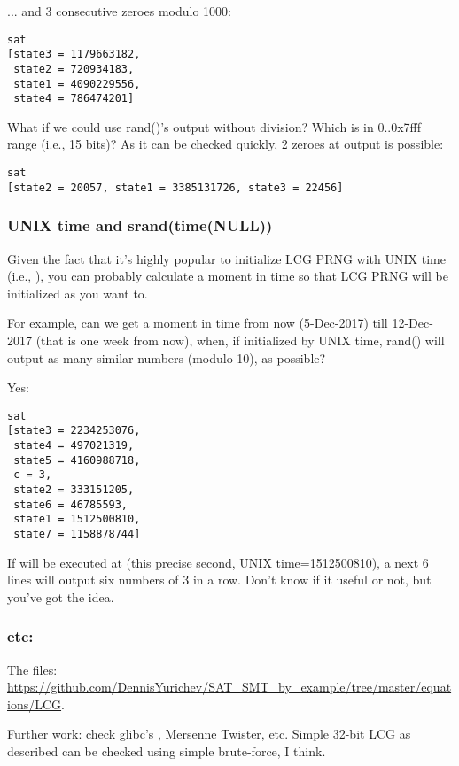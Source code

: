 ... and 3 consecutive zeroes modulo 1000:



\begin{lstlisting}
sat
[state3 = 1179663182,
 state2 = 720934183,
 state1 = 4090229556,
 state4 = 786474201]
\end{lstlisting}

What if we could use rand()'s output without division? Which is in 0..0x7fff range (i.e., 15 bits)?
As it can be checked quickly, 2 zeroes at output is possible:



\begin{lstlisting}
sat
[state2 = 20057, state1 = 3385131726, state3 = 22456]
\end{lstlisting}

\subsubsection{UNIX time and srand(time(NULL))}

Given the fact that it's highly popular to initialize LCG PRNG with UNIX time (i.e., ), you can probably calculate a moment in time so that LCG PRNG will be initialized as you want to.

For example, can we get a moment in time from now (5-Dec-2017) till 12-Dec-2017 (that is one week from now), when, if initialized by UNIX time, rand() will output as many similar numbers (modulo 10), as possible?



Yes:

\begin{lstlisting}
sat
[state3 = 2234253076,
 state4 = 497021319,
 state5 = 4160988718,
 c = 3,
 state2 = 333151205,
 state6 = 46785593,
 state1 = 1512500810,
 state7 = 1158878744]
\end{lstlisting}

If  will be executed at  (this precise second, UNIX time=1512500810), a next 6  lines will output six numbers of 3 in a row.
Don't know if it useful or not, but you've got the idea.

\subsubsection{etc:}

The files: \url{https://github.com/DennisYurichev/SAT_SMT_by_example/tree/master/equations/LCG}.

Further work: check glibc's , Mersenne Twister, etc. Simple 32-bit LCG as described can be checked using simple brute-force, I think.

